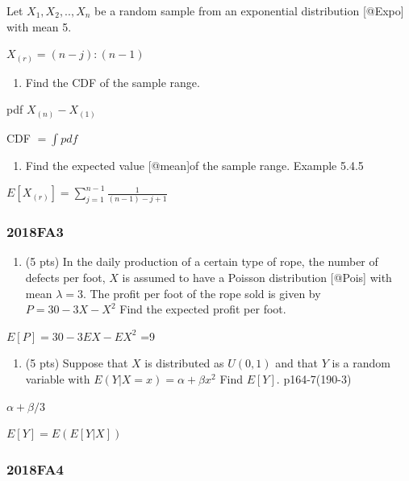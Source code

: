 \documentclass[6pt,twocolumn,Portrait]{article}
\providecommand{\tightlist}{%
  \setlength{\itemsep}{0pt}\setlength{\parskip}{0pt}}
\begin{document}
Let \(X_1,X_2,..,X_n\) be a random sample from an exponential
distribution {[}@Expo{]} with mean 5.

\(X_{(r)}=(n-j):(n-1)\)

\begin{enumerate}
\def\labelenumi{(\alph{enumi})}
\tightlist
\item
  Find the CDF of the sample range.
\end{enumerate}

pdf \(X_{(n)}-X_{(1)}\)

CDF \(=\int pdf\)

\begin{enumerate}
\def\labelenumi{(\alph{enumi})}
\setcounter{enumi}{1}
\tightlist
\item
  Find the expected value {[}@mean{]}of the sample range. Example 5.4.5
\end{enumerate}

\(E[X_{(r)}]=\sum_{j=1}^{n-1}\frac1{(n-1)-j+1}\)

\hypertarget{fa3-4}{%
\subsubsection{2018FA3}\label{fa3-4}}

\begin{enumerate}
\def\labelenumi{(\alph{enumi})}
\tightlist
\item
  (5 pts) In the daily production of a certain type of rope, the number
  of defects per foot, \(X\) is assumed to have a Poisson distribution
  {[}@Pois{]} with mean \(\lambda=3\). The profit per foot of the rope
  sold is given by \(P=30-3X-X^2\) Find the expected profit per foot.
\end{enumerate}

\(E[P]=30-3EX-EX^2\) =9

\begin{enumerate}
\def\labelenumi{(\alph{enumi})}
\setcounter{enumi}{1}
\tightlist
\item
  (5 pts) Suppose that \(X\) is distributed as \(U(0,1)\) and that \(Y\)
  is a random variable with \(E(Y|X=x)=\alpha+\beta x^2\) Find \(E[Y]\).
  p164-7(190-3)
\end{enumerate}

\(\alpha+\beta/3\)

\(E[Y]=E(E[Y|X])\)

\hypertarget{fa4-4}{%
\subsubsection{2018FA4}\label{fa4-4}}
\end{document}
